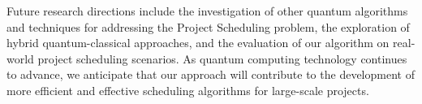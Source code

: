 Future research directions include the investigation of other quantum algorithms and techniques for addressing the Project Scheduling problem, the exploration of hybrid quantum-classical approaches, and the evaluation of our algorithm on real-world project scheduling scenarios. As quantum computing technology continues to advance, we anticipate that our approach will contribute to the development of more efficient and effective scheduling algorithms for large-scale projects.

